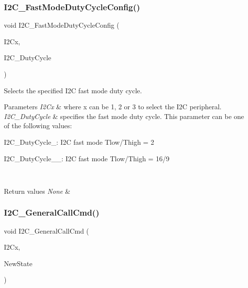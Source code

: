 \subsubsection{\texorpdfstring{I2\+C\+\_\+\+Fast\+Mode\+Duty\+Cycle\+Config()}{I2C\_FastModeDutyCycleConfig()}}
{\footnotesize\ttfamily void I2\+C\+\_\+\+Fast\+Mode\+Duty\+Cycle\+Config (\begin{DoxyParamCaption}\item[{I2\+C\+\_\+\+Type\+Def $\ast$}]{I2\+Cx,  }\item[{uint16\+\_\+t}]{I2\+C\+\_\+\+Duty\+Cycle }\end{DoxyParamCaption})}



Selects the specified I2C fast mode duty cycle. 


\begin{DoxyParams}{Parameters}
{\em I2\+Cx} & where x can be 1, 2 or 3 to select the I2C peripheral. \\
\hline
{\em I2\+C\+\_\+\+Duty\+Cycle} & specifies the fast mode duty cycle. This parameter can be one of the following values\+: \begin{DoxyItemize}
\item I2\+C\+\_\+\+Duty\+Cycle\+\_\+: I2C fast mode Tlow/\+Thigh = 2 \item I2\+C\+\_\+\+Duty\+Cycle\+\_\+\_\+: I2C fast mode Tlow/\+Thigh = 16/9 \end{DoxyItemize}
\\
\hline
\end{DoxyParams}

\begin{DoxyRetVals}{Return values}
{\em None} & \\
\hline
\end{DoxyRetVals}
\mbox{\label{group___i2_c___group1_ga65c740fc8d7b3b9f15cc432d8699d471}} 
\subsubsection{\texorpdfstring{I2\+C\+\_\+\+General\+Call\+Cmd()}{I2C\_GeneralCallCmd()}}
{\footnotesize\ttfamily void I2\+C\+\_\+\+General\+Call\+Cmd (\begin{DoxyParamCaption}\item[{I2\+C\+\_\+\+Type\+Def $\ast$}]{I2\+Cx,  }\item[{Functional\+State}]{New\+State }\end{DoxyParamCaption})}



